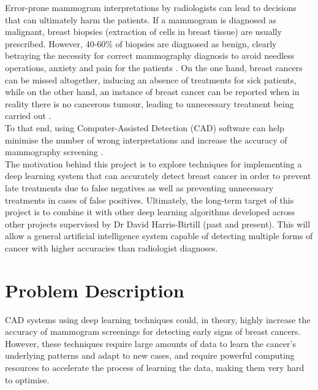 Error-prone mammogram interpretations by radiologists can lead to decisions that can ultimately harm the patients. If a mammogram is diagnosed as malignant, breast biopsies (extraction of cells in breast tissue) are usually prescribed. However, 40-60\% of biopsies are diagnosed as benign, clearly betraying the necessity for correct mammography diagnosis to avoid needless operations, anxiety and pain for the patients \citep{Hepsag2017}. On the one hand, breast cancers can be missed altogether, inducing an absence of treatments for sick patients, while on the other hand, an instance of breast cancer can be reported when in reality there is no cancerous tumour, leading to unnecessary treatment being carried out \citep{Elter2009}.\\

To that end, using Computer-Assisted Detection (CAD) software can help minimise the number of wrong interpretations and increase the accuracy of mammography screening \citep{Shen2017}.\\

The motivation behind this project is to explore techniques for implementing a deep learning system that can accurately detect breast cancer in order to prevent late treatments due to false negatives as well as preventing unnecessary treatments in cases of false positives. Ultimately, the long-term target of this project is to combine it with other deep learning algorithms developed across other projects supervised by Dr David Harris-Birtill (past and present). This will allow a general artificial intelligence system capable of detecting multiple forms of cancer with higher accuracies than radiologist diagnoses.\\


\section{Problem Description}
\label{sec:problem-description}

CAD systems using deep learning techniques could, in theory, highly increase the accuracy of mammogram screenings for detecting early signs of breast cancers. However, these techniques require large amounts of data to learn the cancer's underlying patterns and adapt to new cases, and require  powerful computing resources to accelerate the process of learning the data, making them very hard to optimise.\\

